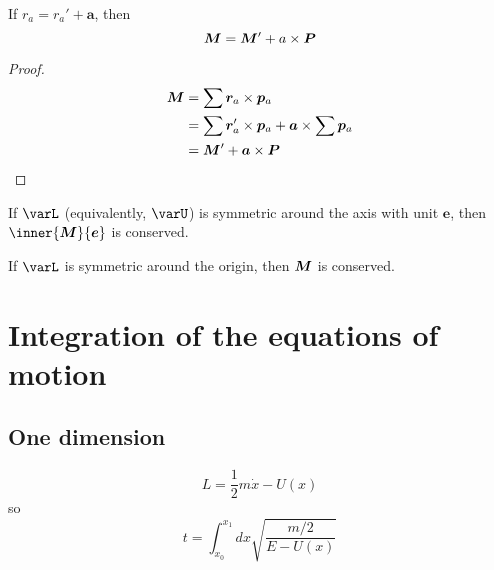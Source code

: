 \documentclass{scrbook}
\numberwithin{thms}{chapter}
\newcommand{\der}{\dot}
\renewcommand{\vec}[1]{\bm{#1}}
\begin{document}
\renewcommand{\vara}{\vec a}
\begin{theorem}
  If $r_a=r_a'+\vara$, then
  \[
    \varM=\varM'+a\times \varP
  \]
\end{theorem}
\begin{proof}
  \begin{align*}
    \varM &= \sum \varr_a\times \varp_a \\
          &=\sum \varr_a'\times \varp_a + \vara\times\sum\varp_a \\
          &=\varM'+\vara\times\varP
  \end{align*}
\end{proof}
\renewcommand{\vare}{\vec e}
\begin{cor}
  If $\varL$ (equivalently, $\varU$) is symmetric around the axis with unit $\vare$, then $\inner{\varM}{\vare}$ is conserved. 
\end{cor}
\begin{cor}
  If $\varL$ is symmetric around the origin, then $\varM$ is conserved. 
\end{cor}
\chapter{Integration of the equations of motion}
\section{One dimension}
\[
  L=\frac 12 m\der x - U(x)
\]
so 
\[
  t=\int_{x_0}^{x_1} dx\sqrt{\frac{m/2}{E-U(x)}}
\]
\end{document}
